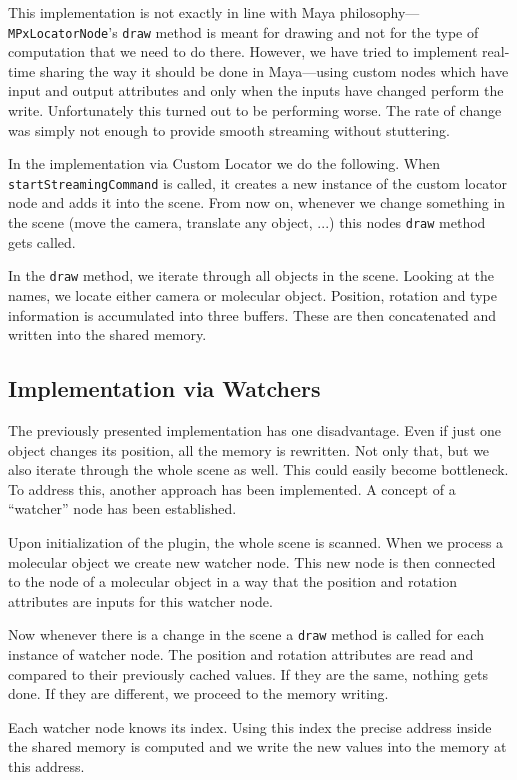 \documentclass[
  digital, %
  table,   %
  nolof,     %
  nolot,     %
]{fithesis3}
\begin{document}
This implementation is not exactly in line with Maya philosophy—\texttt{MPxLocatorNode}'s \texttt{draw} method is meant for drawing and not for the type of computation that we need to do there. However, we have tried to implement real-time sharing the way it should be done in Maya—using custom nodes which have input and output attributes and only when the inputs have changed perform the write. Unfortunately this turned out to be performing worse. The rate of change was simply not enough to provide smooth streaming without stuttering.

In the implementation via Custom Locator we do the following. When \texttt{startStreamingCommand} is called, it creates a new instance of the custom locator node and adds it into the scene. From now on, whenever we change something in the scene (move the camera, translate any object, ...) this nodes \texttt{draw} method gets called.

In the \texttt{draw} method, we iterate through all objects in the scene. Looking at the names, we locate either camera or molecular object. Position, rotation and type information is accumulated into three buffers. These are then concatenated and written into the shared memory.

\subsection{Implementation via Watchers}
The previously presented implementation has one disadvantage. Even if just one object changes its position, all the memory is rewritten. Not only that, but we also iterate through the whole scene as well. This could easily become bottleneck. To address this, another approach has been implemented. A concept of a ``watcher'' node has been established.

Upon initialization of the plugin, the whole scene is scanned. When we process a molecular object we create new watcher node. This new node is then connected to the node of a molecular object in a way that the position and rotation attributes are inputs for this watcher node.

Now whenever there is a change in the scene a \texttt{draw} method is called for each instance of watcher node. The position and rotation attributes are read and compared to their previously cached values. If they are the same, nothing gets done. If they are different, we proceed to the memory writing.

Each watcher node knows its index. Using this index the precise address inside the shared memory is computed and we write the new values into the memory at this address.
\end{document}
